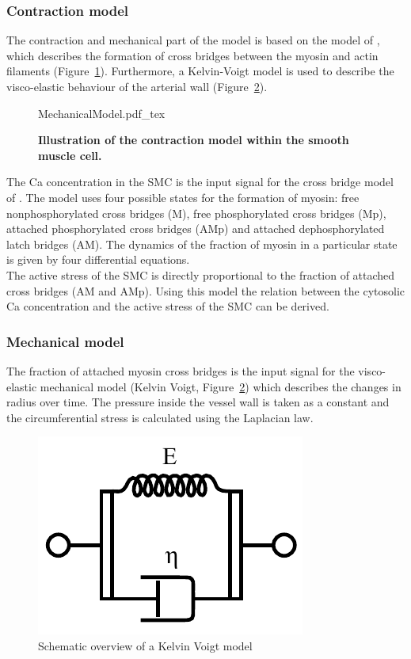 \subsubsection{Contraction model}
The contraction and mechanical part of the model is based on the model of \citet{Hai1989}, which describes the formation of cross bridges between the myosin and actin filaments (Figure~\ref{fig:MechModell}). Furthermore, a Kelvin-Voigt model is used to describe the visco-elastic behaviour of the arterial wall (Figure~\ref{fig:KelvinVoigt}).\\
\begin{figure}[h!]
  \centering
  \def\svgwidth{450pt} %
  \footnotesize
  {MechanicalModel.pdf_tex}
  \caption{\textbf{Illustration of the contraction model within the smooth muscle cell. }}
\label{fig:MechModell}
\end{figure}
The \gls{Ca} concentration in the SMC is the input signal for the cross bridge model of \citet{Hai1989}. The model uses four possible states for the formation of myosin: free nonphosphorylated cross bridges (M), free phosphorylated cross bridges (Mp), attached phosphorylated cross bridges (AMp) and attached dephosphorylated latch bridges (AM). The dynamics of the fraction of myosin in a particular state is given by four differential equations.\\
The active stress of the SMC is directly proportional to the fraction of attached cross bridges (AM and AMp). Using this model the relation between the cytosolic \gls{Ca} concentration and the active stress of the SMC can be derived.\\

\subsubsection{Mechanical model}
The fraction of attached myosin cross bridges is the input signal for the visco-elastic mechanical model (Kelvin Voigt, Figure~\ref{fig:KelvinVoigt})  which describes the changes in radius over time. The pressure inside the vessel wall is taken as a constant and the circumferential stress is calculated using the Laplacian law. 


\begin{figure}[h!]
  \centering
  \includegraphics[width = 5 cm]{pics/Kelvin_Voigt_diagram.pdf}
  \caption{Schematic overview of a Kelvin Voigt model}
  \label{fig:KelvinVoigt}
\end{figure}

